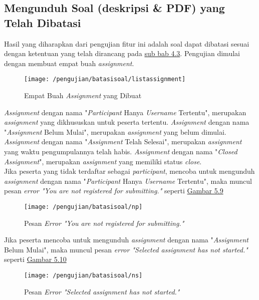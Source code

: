	\subsection{Mengunduh Soal (deskripsi \& PDF) yang Telah Dibatasi} 
	Hasil yang diharapkan dari pengujian fitur ini adalah soal dapat dibatasi sesuai dengan ketentuan yang telah dirancang pada \hyperref[chap:batassoal]{sub bab 4.3}. Pengujian dimulai dengan membuat empat buah \textit{assignment}.
	\begin{figure}[H]
		\centering  
		\texttt{[image: /pengujian/batasisoal/listassignment]}  
		\caption[Empat Buah \textit{Assignment} yang Dibuat]{Empat Buah \textit{Assignment} yang Dibuat} 
		\label{fig:listassignment} 
	\end{figure}
	
	\textit{Assignment} dengan nama "\textit{Participant} Hanya \textit{Username} Tertentu", merupakan \textit{assignment} yang dikhususkan untuk peserta tertentu. \textit{Assignment} dengan nama "\textit{Assignment} Belum Mulai", merupakan \textit{assignment} yang belum dimulai. \textit{Assignment} dengan nama "\textit{Assignment} Telah Selesai", merupakan \textit{assignment} yang waktu pengumpulannya telah habis. \textit{Assignment} dengan nama "\textit{Closed Assignment}", merupakan \textit{assignment} yang memiliki status \textit{close}. \\
	
	Jika peserta yang tidak terdaftar sebagai \textit{participant}, mencoba untuk mengunduh \textit{assignment} dengan nama "\textit{Participant} Hanya \textit{Username} Tertentu", maka muncul pesan \textit{error "You are not registered for submitting."} seperti \hyperref[fig:np]{Gambar 5.9} 
	\begin{figure}[H]
		\centering  
		\texttt{[image: /pengujian/batasisoal/np]}  
		\caption[Pesan \textit{Error "You are not registered for submitting."}]{Pesan \textit{Error "You are not registered for submitting."}} 
		\label{fig:np} 
	\end{figure}

	Jika peserta mencoba untuk mengunduh \textit{assignment} dengan nama "\textit{Assignment} Belum Mulai", maka muncul pesan \textit{error "Selected assignment has not started."} seperti \hyperref[fig:ns]{Gambar 5.10} 
	\begin{figure}[H]
		\centering  
		\texttt{[image: /pengujian/batasisoal/ns]}  
		\caption[Pesan \textit{Error "Selected assignment has not started."}]{Pesan \textit{Error "Selected assignment has not started."}} 
		\label{fig:ns} 
	\end{figure}

